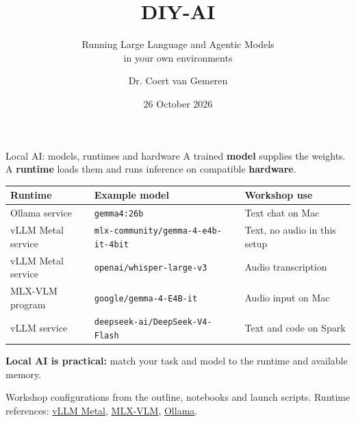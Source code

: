 \documentclass[aspectratio=169,12pt]{beamer}
\title{DIY-AI}
\subtitle{Running Large Language and Agentic Models\\in your own environments}
\author{Dr. Coert van Gemeren}
\institute{HU University of Applied Sciences Utrecht}
\date{26 October 2026}
\newcommand{\source}[1]{\par\vfill{\fontsize{7}{8.5}\selectfont\color{black!65}#1\par}}
\newcommand{\modelid}[1]{{\fontsize{8}{9.5}\selectfont\texttt{#1}}}
\newcommand{\lead}[1]{{\usebeamercolor[fg]{structure}\bfseries #1}}
\begin{document}
\begin{frame}
\titlepage
{}
\end{frame}

\begin{frame}{Local AI: models, runtimes and hardware}
\small
A trained \textbf{model} supplies the weights. A \textbf{runtime} loads them
and runs inference on compatible \textbf{hardware}.
\par\medskip

{\footnotesize
\begin{tabularx}{\textwidth}{@{}>{\raggedright\arraybackslash}p{}Y >{\raggedright\arraybackslash}p{0.22\textwidth}@{}}
\toprule
\textbf{Runtime} & \textbf{Example model} & \textbf{Workshop use} \\
\midrule
Ollama service & \modelid{gemma4:26b} & Text chat on Mac \\
\addlinespace[0.3em]
vLLM Metal service & \modelid{mlx-community/gemma-4-e4b-it-4bit} & Text, no audio in this setup \\
\addlinespace[0.3em]
vLLM Metal service & \modelid{openai/whisper-large-v3} & Audio transcription \\
\addlinespace[0.3em]
MLX-VLM program & \modelid{google/gemma-4-E4B-it} & Audio input on Mac \\
\addlinespace[0.3em]
vLLM service & \modelid{deepseek-ai/DeepSeek-V4-Flash} & Text and code on Spark \\
\bottomrule
\end{tabularx}}
\par\medskip
\lead{Local AI is practical:} match your task and model to the runtime and available memory.
\source{Workshop configurations from the outline, notebooks and launch scripts.
Runtime references: \href{https://github.com/vllm-project/vllm-metal}{vLLM Metal},
\href{https://github.com/Blaizzy/mlx-vlm}{MLX-VLM},
\href{https://docs.ollama.com/quickstart}{Ollama}.}
\end{frame}
\end{document}
